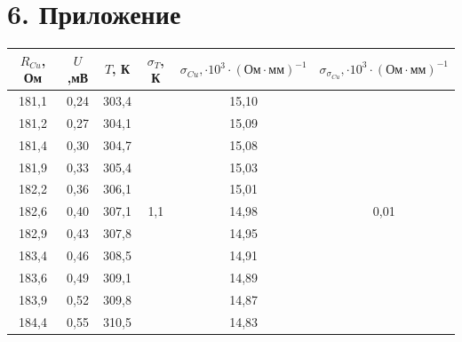 \documentclass[a4paper,12pt]{report}
\begin{document}
\newpage
\section*{6. Приложение}

\begin{table}[h!]
\begin{tabular}{|c|c|c|c|c|c|}
\hline
$R_{Cu}$, Ом  &  $U$,мВ & $T$, К  & $\sigma_{T}$, К           & $\sigma_{Cu}, \cdot 10^{3} \cdot (\text{Ом}\cdot\text{мм})^{-1}$ & $\sigma_{\sigma_{Cu}}, \cdot 10^{3} \cdot (\text{Ом}\cdot\text{мм})^{-1}$  \\ \hline
181,1     & 0,24 & 303,4 & \multirow{36}{*}{1,1} & 15,10                            & \multirow{36}{*}{0,01}                 \\ \cline{1-3} \cline{5-5}
181,2     & 0,27 & 304,1 &                       & 15,09                            &                                        \\ \cline{1-3} \cline{5-5}
181,4     & 0,30 & 304,7 &                       & 15,08                            &                                        \\ \cline{1-3} \cline{5-5}
181,9     & 0,33 & 305,4 &                       & 15,03                            &                                        \\ \cline{1-3} \cline{5-5}
182,2     & 0,36 & 306,1 &                       & 15,01                            &                                        \\ \cline{1-3} \cline{5-5}
182,6     & 0,40 & 307,1 &                       & 14,98                            &                                        \\ \cline{1-3} \cline{5-5}
182,9     & 0,43 & 307,8 &                       & 14,95                            &                                        \\ \cline{1-3} \cline{5-5}
183,4     & 0,46 & 308,5 &                       & 14,91                            &                                        \\ \cline{1-3} \cline{5-5}
183,6     & 0,49 & 309,1 &                       & 14,89                            &                                        \\ \cline{1-3} \cline{5-5}
183,9     & 0,52 & 309,8 &                       & 14,87                            &                                        \\ \cline{1-3} \cline{5-5}
184,4     & 0,55 & 310,5 &                       & 14,83                            &                                        \\ \cline{1-3} \cline{5-5}

\end{tabular}
\end{table}
\end{document}
